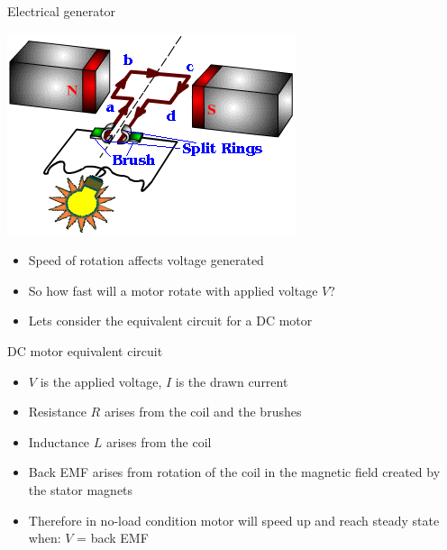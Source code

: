 \documentclass[compress]{beamer}
\begin{document}
\begin{frame}{Electrical generator}

    \begin{center}
        \includegraphics[width=0.6\linewidth]{image30}
    \end{center}

\begin{itemize}

\item Speed of rotation affects voltage generated
\item So how fast will a motor rotate with applied voltage $V$?
\item Lets consider the equivalent circuit for a DC motor
\end{itemize}
\end{frame}

\begin{frame}{DC motor equivalent circuit}

    \begin{center}
    \end{center}

\footnotesize
\begin{itemize}

\item $V$ is the applied voltage, $I$ is the drawn current
\item Resistance $R$ arises from the coil and the brushes
\item Inductance $L$ arises from the coil
\item Back EMF arises from rotation of the coil in the magnetic field
  created by the stator magnets
\item Therefore in no-load condition motor will speed up and reach steady
  state when: $V$ = back EMF
\end{itemize}

\end{frame}
\end{document}
